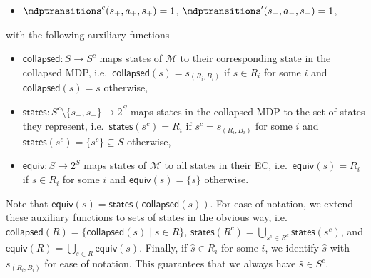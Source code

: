 \documentclass{theoretics}
\newcommand{\UnionSym}{\bigcup}
\newcommand{\Union}{\UnionSym}
\newcommand{\MDP}{\mathcal{M}}
\newcommand{\States}{S}
\newcommand{\initialstate}{\hat{s}}
\newcommand{\targetstate}{s_+}
\newcommand{\sinkstate}{s_-}
\newcommand{\ecequivalent}{\mathsf{equiv}}
\newcommand{\eccollapsed}{\mathsf{collapsed}}
\newcommand{\ecstates}{\mathsf{states}}
\begin{document}
\begin{definition}
\begin{itemize}
\begin{itemize}
			\item $\mdptransitions^c(\targetstate, a_+, \targetstate) = 1$, $\mdptransitions'(\sinkstate, a_-, \sinkstate) = 1$,
		\end{itemize}
	\end{itemize}
	with the following auxiliary functions
	\begin{itemize}
		\item $\eccollapsed : \States \to \States^c$ maps states of $\MDP$ to their corresponding state in the collapsed MDP, i.e.\ $\eccollapsed(s) = s_{(R_i, B_i)}$ if $s \in R_i$ for some $i$ and $\eccollapsed(s) = s$ otherwise,
		\item $\ecstates : \States^c \setminus \{\targetstate, \sinkstate\} \to 2^\States$ maps states in the collapsed MDP to the set of states they represent, i.e.\ $\ecstates(s^c) = R_i$ if $s^c = s_{(R_i,B_i)}$ for some $i$ and $\ecstates(s^c) = \{s^c\} \subseteq \States$ otherwise,
		\item $\ecequivalent : \States \to 2^\States$ maps states of $\MDP$ to all states in their EC, i.e.\ $\ecequivalent(s) = R_i$ if $s \in R_i$ for some $i$ and $\ecequivalent(s) = \{s\}$ otherwise.
	\end{itemize}
	Note that $\ecequivalent(s) = \ecstates(\eccollapsed(s))$.
	For ease of notation, we extend these auxiliary functions to sets of states in the obvious way, i.e.\ $\eccollapsed(R) = \{\eccollapsed(s) \mid s \in R\}$, $\ecstates(R^c) = \Union_{s^c \in R^c} \ecstates(s^c)$, and $\ecequivalent(R) = \Union_{s \in R} \ecequivalent(s)$.
	Finally, if $\initialstate \in R_i$ for some $i$, we identify $\initialstate$ with $s_{(R_i, B_i)}$ for ease of notation.
	This guarantees that we always have $\initialstate \in \States^c$.
\end{definition}
\end{document}
